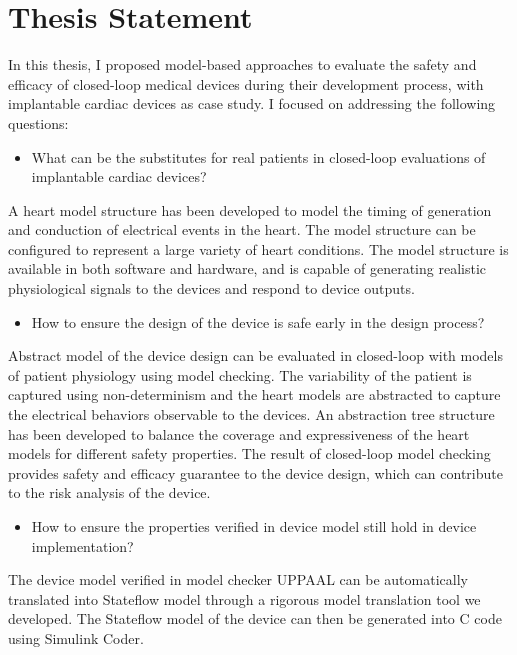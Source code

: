 \documentclass[a4paper]{article}
\begin{document}
\section*{Thesis Statement}
In this thesis, I proposed model-based approaches to evaluate the safety and efficacy of closed-loop medical devices during their development process, with implantable cardiac devices as case study.
I focused on addressing the following questions:
\begin{itemize}
	\item What can be the substitutes for real patients in closed-loop evaluations of implantable cardiac devices?
\end{itemize}
A heart model structure has been developed to model the timing of generation and conduction of electrical events in the heart.
The model structure can be configured to represent a large variety of heart conditions.
The model structure is available in both software and hardware, and is capable of generating realistic physiological signals to the devices and respond to device outputs.
\begin{itemize}
\item How to ensure the design of the device is safe early in the design process? 
\end{itemize}
Abstract model of the device design can be evaluated in closed-loop with models of patient physiology using model checking.
The variability of the patient is captured using non-determinism and the heart models are abstracted to capture the electrical behaviors observable to the devices.
An abstraction tree structure has been developed to balance the coverage and expressiveness of the heart models for different safety properties.
The result of closed-loop model checking provides safety and efficacy guarantee to the device design, which can contribute to the risk analysis of the device.
\begin{itemize}
	\item How to ensure the properties verified in device model still hold in device implementation?
\end{itemize}
The device model verified in model checker UPPAAL can be automatically translated into Stateflow model through a rigorous model translation tool we developed.
The Stateflow model of the device can then be generated into C code using Simulink Coder.
\end{document}
